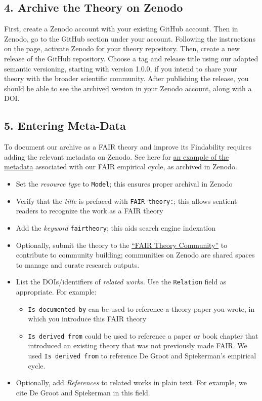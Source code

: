 \documentclass[
  man, noextraspace,floatsintext]{apa7}
\providecommand{\tightlist}{%
  \setlength{\itemsep}{0pt}\setlength{\parskip}{0pt}}
\begin{document}
\subsection{4. Archive the Theory on Zenodo}\label{archive-the-theory-on-zenodo}

First, create a Zenodo account with your existing GitHub account.
Then in Zenodo, go to the GitHub section under your account.
Following the instructions on the page, activate Zenodo for your theory repository.
Then, create a new release of the GitHub repository.
Choose a tag and release title using our adapted semantic versioning, starting with version 1.0.0, if you intend to share your theory with the broader scientific community.
After publishing the release,
you should be able to see the archived version in your Zenodo account,
along with a DOI.

\subsection{5. Entering Meta-Data}\label{entering-meta-data}

To document our archive as a FAIR theory and improve its Findability requires adding the relevant metadata on Zenodo.
See here for \href{https://raw.githubusercontent.com/cjvanlissa/fair_theory/refs/heads/main/example_metadata.json}{an example of the metadata} associated with our FAIR empirical cycle, as archived in Zenodo.

\begin{itemize}
\tightlist
\item
  Set the \emph{resource type} to \texttt{Model}; this ensures proper archival in Zenodo
\item
  Verify that the \emph{title} is prefaced with \texttt{FAIR\ theory:}; this allows sentient readers to recognize the work as a FAIR theory
\item
  Add the \emph{keyword} \texttt{fairtheory}; this aids search engine indexation
\item
  Optionally, submit the theory to the \href{https://zenodo.org/communities/fairtheory}{``FAIR Theory Community''} to contribute to community building; communities on Zenodo are shared spaces to manage and curate research outputs.
\item
  List the DOIs/identifiers of \emph{related works}. Use the \texttt{Relation} field as appropriate. For example:

  \begin{itemize}
  \tightlist
  \item
    \texttt{Is\ documented\ by} can be used to reference a theory paper you wrote, in which you introduce this FAIR theory
  \item
    \texttt{Is\ derived\ from} could be used to reference a paper or book chapter that introduced an existing theory that was not previously made FAIR. We used \texttt{Is\ derived\ from} to reference De Groot and Spiekerman's empirical cycle.
  \end{itemize}
\item
  Optionally, add \emph{References} to related works in plain text. For example, we cite De Groot and Spiekerman in this field.
\end{itemize}
\end{document}
